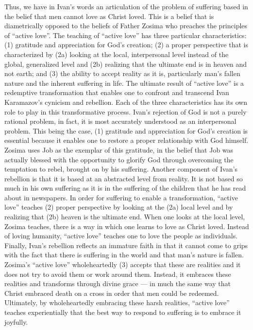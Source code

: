 Thus, we have in Ivan's words an articulation of the problem of suffering based in the belief that men cannot love as Christ loved. This is a belief that is diametrically opposed to the beliefs of Father Zosima who preaches the principles of ``active love''. The teaching of ``active love'' has three particular characteristics: (1) gratitude and appreciation for God's creation; (2) a proper perspective that is characterized by (2a) looking at the local, interpersonal level instead of the global, generalized level and (2b) realizing that the ultimate end is in heaven and not earth; and (3) the ability to accept reality as it is, particularly man's fallen nature and the inherent suffering in life. The ultimate result of ``active love'' is a redemptive transformation that enables one to confront and transcend Ivan Karamazov's cynicism and rebellion. Each of the three characteristics has its own role to play in this transformative process. Ivan's rejection of God is not a purely rational problem, in fact, it is most accurately understood as an interpersonal problem. This being the case, (1) gratitude and appreciation for God's creation is essential because it enables one to restore a proper relationship with God himself. Zosima uses Job as the exemplar of this gratitude, in the belief that Job was actually blessed with the opportunity to glorify God through overcoming the temptation to rebel, brought on by his suffering. Another component of Ivan's rebellion is that it is based at an abstracted level from reality. It is not based so much in his own suffering as it is in the suffering of the children that he has read about in newspapers. In order for suffering to enable a transformation, ``active love'' teaches (2) proper perspective by looking at the (2a) local level and by realizing that (2b) heaven is the ultimate end. When one looks at the local level, Zosima teaches, there is a way in which one learns to love as Christ loved. Instead of loving humanity, ``active love'' teaches one to love the people as individuals. Finally, Ivan's rebellion reflects an immature faith in that it cannot come to grips with the fact that there is suffering in the world and that man's nature is fallen. Zosima's ``active love'' wholeheartedly (3) accepts that these are realities and it does not try to avoid them or work around them. Instead, it embraces these realities and transforms through divine grace --- in much the same way that Christ embraced death on a cross in order that men could be redeemed. Ultimately, by wholeheartedly embracing these harsh realities, ``active love'' teaches experientially that the best way to respond to suffering is to embrace it joyfully.

